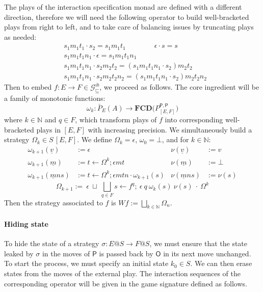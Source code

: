 \documentclass[sigplan,screen]{acmart}
\newcommand{\gcat}{\mathcal{G}_{\sqsubseteq}}
\newcommand{\kw}[1]{\ensuremath{ \mathsf{#1} }}
\begin{document}
The plays of the interaction specification monad
are defined with a different direction,
therefore
we will need the following operator to build
well-bracketed plays from right to left,
and to take care of balancing issues
by truncating plays as needed:
\begin{align*}
&  s_1 m_1 t_1 \cdot s_2 = s_1 m_1 t_1 \qquad \qquad
   \epsilon \cdot s = s \\
&  s_1 m_1 t_1 n_1 \cdot \epsilon = s_1 m_1 t_1 n_1 \\
&  s_1 m_1 t_1 n_1 \cdot s_2 m_2 t_2 =
    (s_1 m_1 t_1 n_1 \cdot s_2) m_2 t_2 \\
&  s_1 m_1 t_1 n_1 \cdot s_2 m_2 t_2 n_2 =
    (s_1 m_1 t_1 n_1 \cdot s_2) m_2 t_2 n_2
\end{align*}
Then to embed $f : E \rightarrow F \in \gcat^{ib}$,
we proceed as follows.
The core ingredient will be
a family of monotonic functions:
\[
  \omega_k : \bar{P}_E(A) \rightarrow
    \mathbf{FCD} \Big( P_{[E,F]}^{\kw{P},\kw{P}} \Big)
\]
where $k \in \mathbb{N}$ and $q \in F$,
which transform plays of $f$ into
corresponding well-bracketed plays in $[E,F]$
with increasing precision.
We simultaneously build a
strategy $\Omega_k \in S\,[E,F]$.
We define $\Omega_k = \epsilon$, $\omega_0 = \bot$,
and for $k \in \mathbb{N}$:
\begin{align*}
  \omega_{k+1}(\underline{v}) &:= \epsilon
  &
  \nu(\underline{v}) &:= v
  \\
  \omega_{k+1}(\underline{m}) &:=
    t \leftarrow \Omega^k ; \epsilon m t
  &
  \nu(\underline{m}) &:= \bot
  \\
  \omega_{k+1}(\underline{m}ns) &:=
    t \leftarrow \Omega^k ; \epsilon m t n \cdot \omega_{k+1}(s)
  &
  \nu(\underline{m}ns) &:= \nu(s)
\end{align*}
\[
  \Omega_{k+1} := \:
    \epsilon \: \sqcup \: \bigsqcup_{q \in F}
      s \leftarrow f^q ; \:
      \epsilon \: q \: \omega_k (s) \: \nu (s) \: \cdot \: \Omega^k
\]
Then the strategy associated to $f$
is $W f := \bigsqcup_{k \in \mathbb{N}} \Omega_n$.


\paragraph{Hiding state}

To hide the state of a strategy
$\sigma : E@S \rightarrow F@S$,
we must ensure that the state
leaked by $\sigma$ in the moves of $\kw{P}$
is passed back by $\kw{O}$ in its next move unchanged.
To start the process,
we must specify an initial state $k_0 \in S$.
We can then erase states from the moves of the external play.
The interaction sequences of the corresponding operator
will be given in the game signature defined as follows.
\end{document}
